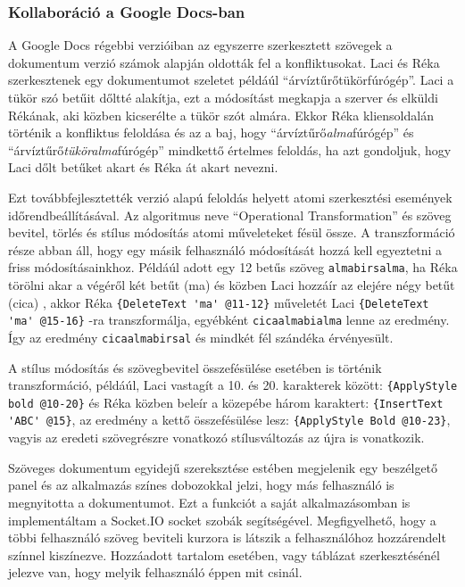 \subsubsection{Kollaboráció a Google Docs-ban}

A Google Docs régebbi verzióiban az egyszerre szerkesztett szövegek a dokumentum verzió számok alapján oldották fel a konfliktusokat\cite{googcoll1}. Laci és Réka szerkesztenek egy dokumentumot szeletet példáúl ``árvíztűrőtükörfúrógép''. Laci a tükör szó betűit dőltté alakítja, ezt a módosítást megkapja a szerver és elküldi Rékának, aki közben kicserélte a tükör szót almára. Ekkor Réka kliensoldalán történik a konfliktus feloldása és az a baj, hogy ``árvíztűrő\emph{alma}fúrógép'' és ``árvíztűrő\emph{tükör}\emph{alma}fúrógép'' mindkettő értelmes feloldás, ha azt gondoljuk, hogy Laci dőlt betűket akart és Réka át akart nevezni.

Ezt továbbfejlesztették verzió alapú feloldás helyett atomi szerkesztési események időrendbeállításával. Az algoritmus neve ``Operational Transformation''\cite{googcoll2} és szöveg bevitel, törlés és stílus módosítás atomi műveleteket fésül össze. A transzformáció része abban áll, hogy egy másik felhasználó módosítását hozzá kell egyeztetni a friss módosításainkhoz. Példáúl adott egy 12 betűs szöveg \lstinline{almabirsalma}, ha Réka törölni akar a végéről két betűt (ma) és közben Laci hozzáír az elejére négy betűt (cica) , akkor Réka \lstinline|{DeleteText 'ma' @11-12}| műveletét Laci \lstinline|{DeleteText 'ma' @15-16}| -ra transzformálja, egyébként \lstinline{cicaalmabialma} lenne az eredmény. Így az eredmény \lstinline{cicaalmabirsal} és mindkét fél szándéka érvényesült.

A stílus módosítás és szövegbevitel összefésülése esetében is történik transzformáció, példáúl, Laci vastagít a 10. és 20. karakterek között: \lstinline|{ApplyStyle bold @10-20}| és Réka közben beleír a közepébe három karaktert: \lstinline|{InsertText 'ABC' @15}|, az eredmény a kettő összefésülése lesz:  \lstinline|{ApplyStyle Bold @10-23}|, vagyis az eredeti szövegrészre vonatkozó stílusváltozás az újra is vonatkozik.

Szöveges dokumentum egyidejű szereksztése estében megjelenik egy beszélgető panel és az alkalmazás színes dobozokkal jelzi, hogy más felhasználó is megnyitotta a dokumentumot. Ezt a funkciót a saját alkalmazásomban is implementáltam a Socket.IO socket szobák segítségével. Megfigyelhető, hogy a többi felhasználó szöveg beviteli kurzora is látszik a felhasználóhoz hozzárendelt színnel kiszínezve. Hozzáadott tartalom esetében, vagy táblázat szerkesztésénél jelezve van, hogy melyik felhasználó éppen mit csinál.

